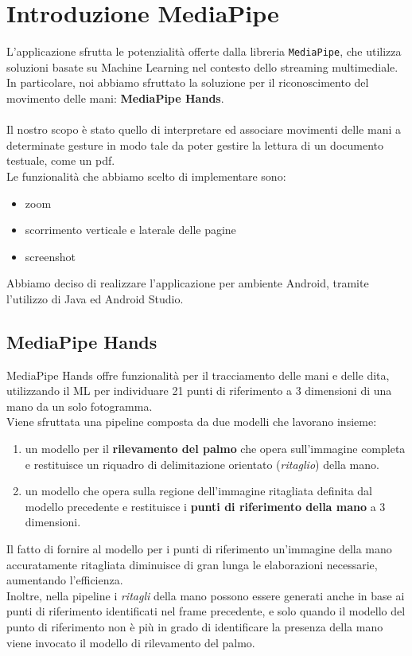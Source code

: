 \chapter{Introduzione MediaPipe}

L'applicazione sfrutta le potenzialità offerte dalla libreria \texttt{MediaPipe}, che utilizza soluzioni basate su Machine Learning nel contesto dello streaming multimediale. 
In particolare, noi abbiamo sfruttato la soluzione per il riconoscimento del movimento delle mani: \textbf{MediaPipe Hands}.\\
\\
\noindent Il nostro scopo è stato quello di interpretare ed associare movimenti delle mani a determinate gesture in modo tale da poter gestire la lettura di un documento testuale, come un pdf.\\Le funzionalità che abbiamo scelto di implementare sono:
\begin{itemize}
    \item zoom
    \item scorrimento verticale e laterale delle pagine
    \item screenshot
\end{itemize}
\noindent Abbiamo deciso di realizzare l'applicazione per ambiente Android, tramite l'utilizzo di Java ed Android Studio.


\section{MediaPipe Hands}

MediaPipe Hands offre funzionalità per il tracciamento delle mani e delle dita, utilizzando il ML per individuare 21 punti di riferimento a 3 dimensioni di una mano da un solo fotogramma.\\
Viene sfruttata una pipeline composta da due modelli che lavorano insieme:
\begin{enumerate}
    \item un modello per il \textbf{rilevamento del palmo} che opera sull'immagine completa e restituisce un riquadro di delimitazione orientato (\textit{ritaglio}) della mano. 
    \item un modello che opera sulla regione dell'immagine ritagliata definita dal modello precedente e restituisce i \textbf{punti di riferimento della mano} a 3 dimensioni.
\end{enumerate}

\noindent Il fatto di fornire al modello per i punti di riferimento un'immagine della mano accuratamente ritagliata diminuisce di gran lunga le elaborazioni necessarie, aumentando l'efficienza.\\
Inoltre, nella pipeline i \textit{ritagli} della mano possono essere generati anche in base ai punti di riferimento identificati nel frame precedente, e solo quando il modello del punto di riferimento non è più in grado di identificare la presenza della mano viene invocato il modello di rilevamento del palmo.

